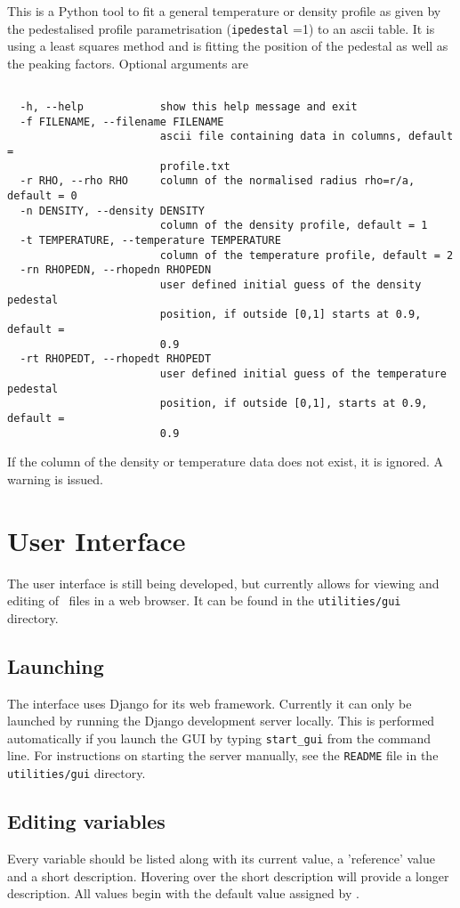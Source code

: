 This is a Python tool to fit a general temperature or density profile as given by the pedestalised profile parametrisation (\texttt{ipedestal} =1) to an ascii table. It is using a least squares method and is fitting the position of the pedestal as well as the peaking factors.  Optional arguments are 
\begin{verbatim}

  -h, --help            show this help message and exit
  -f FILENAME, --filename FILENAME
                        ascii file containing data in columns, default =
                        profile.txt
  -r RHO, --rho RHO     column of the normalised radius rho=r/a, default = 0
  -n DENSITY, --density DENSITY
                        column of the density profile, default = 1
  -t TEMPERATURE, --temperature TEMPERATURE
                        column of the temperature profile, default = 2
  -rn RHOPEDN, --rhopedn RHOPEDN
                        user defined initial guess of the density pedestal
                        position, if outside [0,1] starts at 0.9, default =
                        0.9
  -rt RHOPEDT, --rhopedt RHOPEDT
                        user defined initial guess of the temperature pedestal
                        position, if outside [0,1], starts at 0.9, default =
                        0.9

\end{verbatim}
If the column of the density or temperature data does not exist, it is ignored. A warning is issued.


\section{User Interface}
\label{sec:gui}
The user interface is still being developed, but currently allows for viewing
and editing of \indat\ files in a web browser. It can be found in the
\texttt{utilities/gui} directory.

\subsection{Launching}
The interface uses Django for its web framework. Currently it can only be
launched by running the Django development server locally. This is performed
automatically if you launch the GUI by typing \verb+start_gui+ from the
command line. For instructions on starting the server manually, see the
\verb|README| file in the \texttt{utilities/gui} directory.

\subsection{Editing variables}
Every variable should be listed along with its current value, a 'reference'
value and a short description. Hovering over the short description will
provide a longer description. All values begin with the default value
assigned by \process. 

